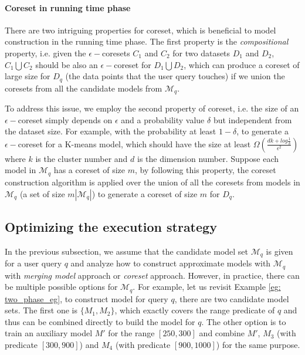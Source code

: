 \paragraph{Coreset in running time phase} There are two intriguing properties for coreset, which is beneficial to model construction in the running time phase. The first property is the {\em compositional} property, i.e. given the $\epsilon-$coresets $C_1$ and $C_2$ for two datasets $D_1$ and $D_2$, $C_1 \bigcup C_2$ should be also an $\epsilon-$coreset for $D_1 \bigcup D_2$, which can produce a coreset of large size for $D_q$ (the data points that the user query touches) if we union the coresets from all the candidate models from $\mathcal{M}_q$. 

To address this issue, we employ the second property of coreset, i.e. the size of an $\epsilon-$coreset simply depends on $\epsilon$ and a probability value $\delta$ but independent from the dataset size. For example, with the probability at least $1-\delta$, to generate a $\epsilon-$coreset for a K-means model, which should have the size at least $\Omega(\frac{dk+log\frac{1}{\delta}}{\epsilon^2})$ where $k$ is the cluster number and $d$ is the dimension number. Suppose each model in $\mathcal{M}_q$ has a coreset of size $m$, by following this property, the coreset construction algorithm is applied over the union of all the coresets from models in $\mathcal{M}_q$ (a set of size $m|\mathcal{M}_q|$) to generate a coreset of size $m$ for $D_q$.


\subsection{Optimizing the execution strategy}\label{sec: opt}
In the previous subsection, we assume that the candidate model set $\mathcal{M}_q$ is given for a user query $q$ and analyze how to construct approximate models with $\mathcal{M}_q$ with {\em merging model} approach or {\em coreset} approach. However, in practice, there can be multiple possible options for $\mathcal{M}_q$. For example, let us revisit Example \ref{eg: two_phase_eg}, to construct model for query $q$, there are two candidate model sets. The first one is $\{M_1, M_2\}$, which exactly covers the range predicate of $q$ and thus can be combined directly to build the model for $q$. The other option is to train an auxiliary model $M'$ for the range $[250, 300]$ and combine $M'$, $M_3$ (with predicate $[300, 900]$) and $M_4$ (with predicate $[900, 1000]$) for the same purpose. 

